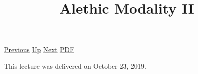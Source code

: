 \documentclass[12pt,a4paper]{report}
\begin{document}
 \href{doc/phil/People/Brandom/OnSellars/2019/AlethicModalityI.html}{Previous} 
 \href{doc/phil/People/Brandom/OnSellars/2019.html}{Up} 
 \href{doc/phil/People/Brandom/OnSellars/2019/BeingandBeingKnown.html}{Next} 
 \href{doc/phil/People/Brandom/OnSellars/2019/AlethicModalityII.pdf}{PDF} 
\title{Alethic Modality II}

\tableofcontents
This lecture was delivered on October 23, 2019.
\end{document}
